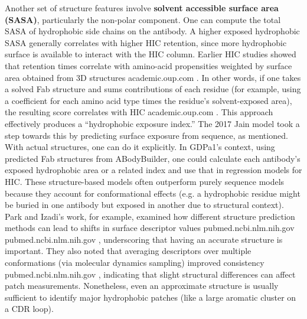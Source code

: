 \documentclass[12pt]{article}
\begin{document}
Another set of structure features involve \textbf{solvent accessible surface area (SASA)}, particularly the non-polar component. One can compute the total SASA of hydrophobic side chains on the antibody. A higher exposed hydrophobic SASA generally correlates with higher HIC retention, since more hydrophobic surface is available to interact with the HIC column. Earlier HIC studies showed that retention times correlate with amino-acid propensities weighted by surface area obtained from 3D structures
academic.oup.com
. In other words, if one takes a solved Fab structure and sums contributions of each residue (for example, using a coefficient for each amino acid type times the residue’s solvent-exposed area), the resulting score correlates with HIC
academic.oup.com
. This approach effectively produces a “hydrophobic exposure index.” The 2017 Jain model took a step towards this by predicting surface exposure from sequence, as mentioned. With actual structures, one can do it explicitly. In GDPa1’s context, using predicted Fab structures from ABodyBuilder, one could calculate each antibody’s exposed hydrophobic area or a related index and use that in regression models for HIC. These structure-based models often outperform purely sequence models because they account for conformational effects (e.g. a hydrophobic residue might be buried in one antibody but exposed in another due to structural context). Park and Izadi’s work, for example, examined how different structure prediction methods can lead to shifts in surface descriptor values
pubmed.ncbi.nlm.nih.gov
pubmed.ncbi.nlm.nih.gov
, underscoring that having an accurate structure is important. They also noted that averaging descriptors over multiple conformations (via molecular dynamics sampling) improved consistency
pubmed.ncbi.nlm.nih.gov
, indicating that slight structural differences can affect patch measurements. Nonetheless, even an approximate structure is usually sufficient to identify major hydrophobic patches (like a large aromatic cluster on a CDR loop).
\end{document}
